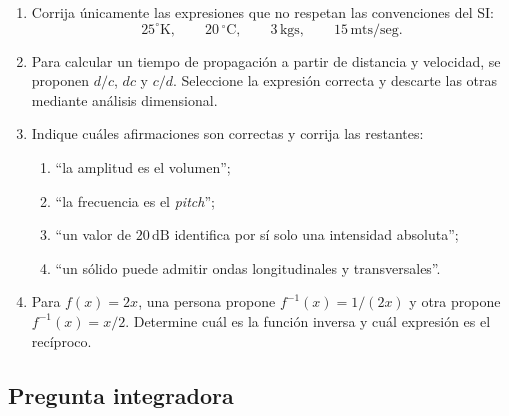\begin{enumerate}[label=\textbf{D\arabic*.},leftmargin=*]
    \item Corrija únicamente las expresiones que no respetan las convenciones del SI:
    \[
        25^{\circ}\text{K},
        \qquad
        20\,^{\circ}\text{C},
        \qquad
        3\,\text{kgs},
        \qquad
        15\,\text{mts}/\text{seg}.
    \]

    \item Para calcular un tiempo de propagación a partir de distancia y velocidad, se proponen \(d/c\), \(dc\) y \(c/d\). Seleccione la expresión correcta y descarte las otras mediante análisis dimensional.

    \item Indique cuáles afirmaciones son correctas y corrija las restantes:
    \begin{enumerate}[label=\alph*)]
        \item ``la amplitud es el volumen'';
        \item ``la frecuencia es el \emph{pitch}'';
        \item ``un valor de \(20\,\text{dB}\) identifica por sí solo una intensidad absoluta'';
        \item ``un sólido puede admitir ondas longitudinales y transversales''.
    \end{enumerate}

    \item Para \(f(x)=2x\), una persona propone \(f^{-1}(x)=1/(2x)\) y otra propone \(f^{-1}(x)=x/2\). Determine cuál es la función inversa y cuál expresión es el recíproco.
\end{enumerate}

\subsection*{Pregunta integradora}

